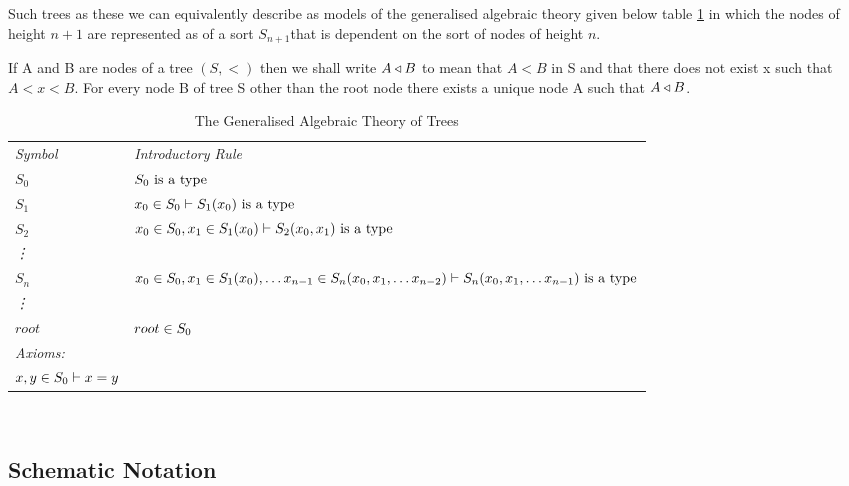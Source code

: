 \documentclass[10pt,a4paper]{scrartcl}
\begin{document}
Such trees as these we can equivalently describe as models of the generalised algebraic theory given below table \ref{GATOFTREES} in which the nodes of height $n+1$ are represented as of a sort $S_{n+1}$that is dependent on the sort of nodes of height $n$.

\newcommand{\Ft}[1]{\downarrow \kern -0.325em #1}
If A and B are nodes of  a tree $(S,<)$ then we shall write $A \triangleleft B$ to mean that $A < B$ in S and that
there does not exist x such that $A < x < B$. For every node B of tree S other than the root node there exists a unique node A such that $A \triangleleft B$.

\newcommand{\Sz}{S_0}
\newcommand{\ofS}[1]{\ofT{#1}{\Sz}}
\newcommand{\Si}[1]{S_{#1}}
\newcommand{\ofSi}[3]{\ofT{#1}{\Si{#2}(#3)}}
\vspace{0.03cm} 
\begin{table}[H]
\caption{The Generalised Algebraic Theory of Trees}
\label{GATOFTREES}
\begin{tabular}{>{\itshape}l l}
Symbol & \itshape{Introductory Rule} \\
$\Sz  $&$\isT{\Sz}$\\
$\Si{1} $&$\ofS{x_0} \tstyle \isT{\Si{1}(x_0)} $\\
$\Si{2} $&$\ofS{x_0},\ofSi{x_1}{1}{x_0} \tstyle \isT{\Si{2}(x_0,x_1)} $\\
\vdots  \\
$\Si{n} $&$\ofS{x_0},\ofSi{x_1}{1}{x_0}, \hdots \ofSi{x_{n-1}}{n}{x_0,x_1,\hdots x_{n-2}} \tstyle \isT{\Si{n}(x_0,x_1,\hdots x_{n-1})} $\\
\vdots   \\
$root$ & $\ofT{root}{\Sz}$ \\
\itshape{Axioms}:  \\
$\ofT{x,y}{\Sz} \tstyle x = y$
\end{tabular} \\
\end{table} 


\subsection {Schematic Notation}
\newcommand{\ft}[1]{
#1 \kern-6pt \raisebox{1.1ex}{$\leftrightline$} \kern-3pt \raisebox{.1ex}{$\downarrow$}}
\newcommand{\bbin}[1]{
\raisebox{-0.5em}{$\stackrel{\displaystyle{\in}} {\scriptstyle{#1}}$}
}
\newcommand{\ofTn}[3]{
#1 \bbin{#2} #3}
\end{document}
